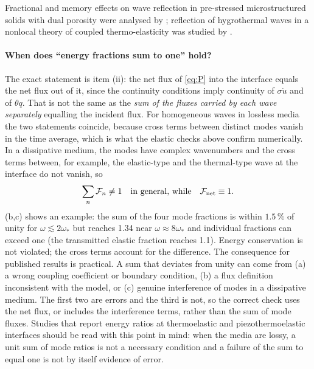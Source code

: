 Fractional and memory effects on wave reflection in pre-stressed microstructured solids with dual porosity were analysed by \citep{Das2025}; reflection of hygrothermal waves in a nonlocal theory of coupled thermo-elasticity was studied by \citep{Yadav2022}.

\paragraph{When does ``energy fractions sum to one'' hold?} The exact statement is item (ii): the net flux of \eqref{eq:P} into the interface equals the net flux out of it, since the continuity conditions imply continuity of $\sigma\dot u$ and of $\theta q$. That is not the same as the \emph{sum of the fluxes carried by each wave separately} equalling the incident flux. For homogeneous waves in lossless media the two statements coincide, because cross terms between distinct modes vanish in the time average, which is what the elastic checks above confirm numerically. In a dissipative medium, the modes have complex wavenumbers and the cross terms between, for example, the elastic-type and the thermal-type wave at the interface do not vanish, so
\begin{equation}
\sum_n\mathcal F_n\ne1\quad\text{in general, while}\quad \mathcal F_{\rm net}\equiv1.
\end{equation}
(b,c) shows an example: the sum of the four mode fractions is within $1.5\,\%$ of unity for $\omega\lesssim2\omega_*$ but reaches 1.34 near $\omega\approx8\omega_*$ and individual fractions can exceed one (the transmitted elastic fraction reaches 1.1). Energy conservation is not violated; the cross terms account for the difference. The consequence for published results is practical. A sum that deviates from unity can come from (a) a wrong coupling coefficient or boundary condition, (b) a flux definition inconsistent with the model, or (c) genuine interference of modes in a dissipative medium. The first two are errors and the third is not, so the correct check uses the net flux, or includes the interference terms, rather than the sum of mode fluxes. Studies that report energy ratios at thermoelastic and piezothermoelastic interfaces \citep{Barak2023,Barak2023IJP,Barak2023JTS,Barak2023MMMS,Gupta2023Energy,Kumar2023PhysScr,Kumar2019,Kumar2022,Kumar2024,Kumar2024a} should be read with this point in mind: when the media are lossy, a unit sum of mode ratios is not a necessary condition and a failure of the sum to equal one is not by itself evidence of error.

